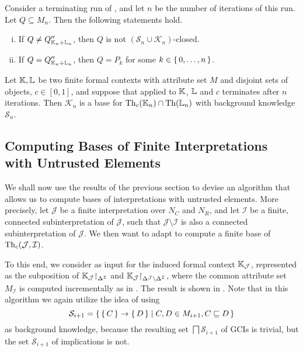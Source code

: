 \begin{Proposition}
  Consider a terminating run of
  , and let $n$ be the number
  of iterations of this run.  Let $Q \subseteq M_{n}$.  Then the following statements
  hold.
  \begin{enumerate}[i. ]
  \item If $Q \neq Q_{{\mathbb{K}}_{n} \div {\ensuremath{\mathbb{L}}}_{n}}''$, then $Q$ is not $(\mathcal{S}_{n} \cup
    \mathcal{K}_{n})$-closed.
  \item If $Q = Q_{{\mathbb{K}}_{n} \div {\ensuremath{\mathbb{L}}}_{n}}''$, then $Q = P_{k}$ for some $k \in {\ensuremath{\{\,
      0, \dots, n \,\}}}$.
  \end{enumerate}
\end{Proposition}
\begin{Theorem}
  \label{thm:confident-bases-with-growing-sets-of-attributes-and-trusted-objects}
  Let ${\mathbb{K}}, {\mathbb{L}}$ be two finite formal contexts with attribute set $M$ and disjoint
  sets of objects, $c \in [0,1]$, and suppose that
   applied to ${\mathbb{K}}$, ${\mathbb{L}}$ and $c$ terminates after $n$ iterations.  Then $\mathcal{K}_{n}$ is a base for
  $\operatorname{Th}_{c}({\mathbb{K}}_{n}) \cap \operatorname{Th}({\mathbb{L}}_{n})$ with background knowledge $\mathcal{S}_{n}$.
\end{Theorem}

\subsection{Computing Bases of Finite Interpretations with Untrusted Elements}
\label{sec:expl-conf-gcis}

We shall now use the results of the previous section to devise an algorithm that allows us
to compute bases of interpretations with untrusted elements.  More precisely, let
$\mathcal{J}$ be a finite interpretation over $N_{C}$ and $N_{R}$, and let $\mathcal{I}$
be a finite, connected subinterpretation of $\mathcal{J}$, such that $\mathcal{J}
\setminus \mathcal{I}$ is also a connected subinterpretation of $\mathcal{J}$.  We then
want to adapt  to compute a
finite base of $\operatorname{Th}_{c}(\mathcal{J}, \mathcal{I})$.

To this end, we consider as input for
 the induced formal context
${\mathbb{K}}_{\mathcal{J}}$, represented as the subposition of ${\mathbb{K}}_{\mathcal{J}}
\mathord{\upharpoonright}_{\Delta^{\mathcal{I}}}$ and ${\mathbb{K}}_{\mathcal{J}}
\mathord{\upharpoonright}_{\Delta^{\mathcal{J}} \setminus \Delta^{\mathcal{I}}}$, where the common
attribute set $M_{\mathcal{I}}$ is computed incrementally as in
.  The result is shown in
.  Note that in this algorithm we again
utilize the idea of using
\begin{equation*}
  \mathcal{S}_{i+1} = {\{\, {\{\, C \,\}} \to {\ensuremath{\{\, D \,\}}} \mid C, D \in M_{i+1}, C \sqsubseteq D \,\}}
\end{equation*}
as background knowledge, because the resulting set $\bigsqcap \mathcal{S}_{i+1}$ of GCIs
is trivial, but the set $\mathcal{S}_{i+1}$ of implications is not.

